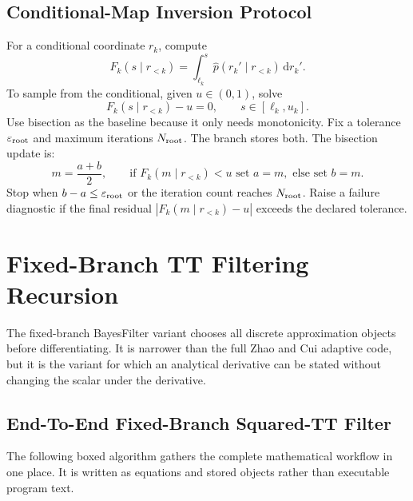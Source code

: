 \documentclass[11pt]{article}
\numberwithin{equation}{section}
\newcommand{\dd}{\,\mathrm d}
\begin{document}
\subsection{Conditional-Map Inversion Protocol}

For a conditional coordinate \(r_k\), compute
\[
    F_k(s\mid r_{<k})
    =
    \int_{\ell_k}^{s}\widehat p(r_k'\mid r_{<k})\dd r_k'.
\]
To sample from the conditional, given \(u\in(0,1)\), solve
\[
    F_k(s\mid r_{<k})-u=0,\qquad s\in[\ell_k,u_k].
\]
Use bisection as the baseline because it only needs monotonicity.  Fix a
tolerance \(\varepsilon_{\rm root}\) and maximum iterations \(N_{\rm root}\).
The branch stores both.  The bisection update is:
\[
    m=\frac{a+b}{2},\qquad
    \text{if }F_k(m\mid r_{<k})<u\text{ set }a=m,\text{ else set }b=m.
\]
Stop when \(b-a\le\varepsilon_{\rm root}\) or the iteration count reaches
\(N_{\rm root}\).  Raise a failure diagnostic if the final residual
\(|F_k(m\mid r_{<k})-u|\) exceeds the declared tolerance.

\section{Fixed-Branch TT Filtering Recursion}

The fixed-branch BayesFilter variant chooses all discrete approximation objects
before differentiating.  It is narrower than the full Zhao and Cui \cite{zhao2024ttsequential} adaptive code,
but it is the variant for which an analytical derivative can be stated without
changing the scalar under the derivative.

\subsection{End-To-End Fixed-Branch Squared-TT Filter}

The following boxed algorithm gathers the complete mathematical workflow in one
place.  It is written as equations and stored objects rather than executable
program text.
\end{document}
